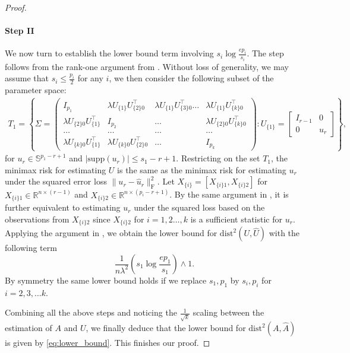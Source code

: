 \documentclass[11pt]{article}
\newcommand{\supp}{\mathrm{supp}}
\newcommand{\dc}[1]{\{#1\}} %
\newcommand{\dist}{\mathrm{dist}}
\newcommand{\0}{{\mathbf{0}}}
\begin{document}
\begin{proof}
\paragraph{Step II}
We now turn to establish the lower bound term involving $s_i\log\frac{ep_i}{s_i}$. The step follows from the rank-one argument from \cite{chen2013sparse}. Without loss of generality, we may assume that $s_i\leq \frac{p_i}{2}$ for any $i$, we then consider the following subset of the parameter space:
\begin{align*}
    T_1=\left\{\Sigma = \begin{pmatrix}
    I_{p_1} &\lambda U_{\dc{1}}U_{\dc{2}0}^\top &\lambda U_{\dc{1}}U_{\dc{3}0}^\top \dots & \lambda U_{\dc{1}}U_{\dc{k}0}^\top\\
  \lambda  U_{\dc{2}0}U_{\dc{1}}^\top &I_{p_2} &\dots&\lambda U_{\dc{2}0}U_{\dc{k}0}^\top\\
    \dots & \dots &\dots &\dots\\
   \lambda U_{\dc{k}0}U_{\dc{1}}^\top &  \lambda U_{\dc{k}0}U_{\dc{2}0}^\top&\dots&
    I_{p_k}
    \end{pmatrix}: U_{\dc{1}}=\begin{bmatrix}
    I_{r-1}&0\\
    0&u_r
    \end{bmatrix}
   \right\},
\end{align*}
for $u_r\in\mathbb{S}^{p_1-r+1}$ and $|\supp(u_r)|\leq s_1-r+1$. Restricting on the set $T_1$, the minimax risk for estimating $U$ is the same as the minimax risk for estimating $u_r$ under the squared error loss $\|u_r-\widehat{u}_r\|_\mathrm{F}^2$. Let $X_{\dc{i}} = [X_{\dc{i}1}, X_{\dc{i}2}]$ for $X_{\dc{i}1}\in\mathbb{R}^{n\times{(r-1)}}$ and $X_{\dc{i}2}\in\mathbb{R}^{n\times{(p_i-r+1)}}$. By the same argument in \cite{gao2015minimax}, it is further equivalent to estimating $u_r$ under the squared loss based on the observations from $X_{\dc{i}2}$ since $X_{\dc{i}2}$ for $i=1, 2\dots, k$ is a sufficient statistic for $u_r$. Applying the argument in \cite{chen2013sparse}, we obtain the lower bound for $\dist^2(U, \widehat{U})$ with the following term\begin{equation*}
    \frac{1}{n\lambda^2}\left(s_1\log\frac{ep_1}{s_1}\right)\wedge 1.
\end{equation*}
By symmetry the same lower bound holds if we replace $s_1, p_1$ by $s_i, p_i$ for $i=2, 3,\dots k$.
\par Combining all the above steps and noticing the $\frac{1}{\sqrt{k}}$ scaling between the estimation of $A$ and $U$, we finally deduce that the lower bound for $\dist^2(A, \widehat{A})$ is given by \eqref{eq:lower_bound}. This finishes our proof. 
\end{proof}
\end{document}

